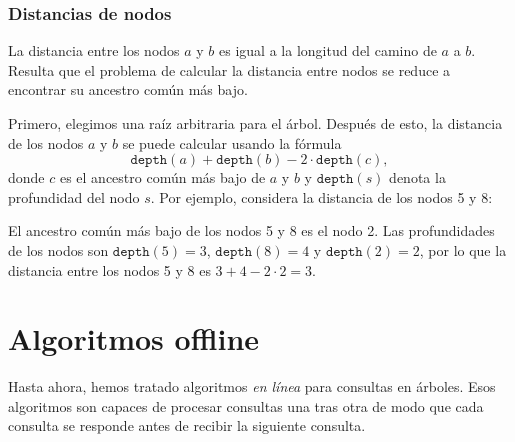 \subsubsection{Distancias de nodos}

La distancia entre los nodos $a$ y $b$
es igual a la longitud del camino de $a$ a $b$.
Resulta que el problema de calcular
la distancia entre nodos se reduce a
encontrar su ancestro común más bajo.

Primero, elegimos una raíz arbitraria para el árbol.
Después de esto, la distancia de los nodos $a$ y $b$
se puede calcular usando la fórmula
\[\texttt{depth}(a)+\texttt{depth}(b)-2 \cdot \texttt{depth}(c),\]
donde $c$ es el ancestro común más bajo de $a$ y $b$
y $\texttt{depth}(s)$ denota la profundidad del nodo $s$.
Por ejemplo, considera la distancia de los nodos 5 y 8:
\begin{center}
\end{center}

El ancestro común más bajo de los nodos 5 y 8 es el nodo 2.
Las profundidades de los nodos son
$\texttt{depth}(5)=3$, $\texttt{depth}(8)=4$ y $\texttt{depth}(2)=2$,
por lo que la distancia entre los nodos 5 y 8 es
$3+4-2\cdot2=3$.

\section{Algoritmos offline}

Hasta ahora, hemos tratado algoritmos \emph{en línea}
para consultas en árboles.
Esos algoritmos son capaces de procesar
consultas una tras otra de modo que
cada consulta se responde antes de recibir la siguiente consulta.

